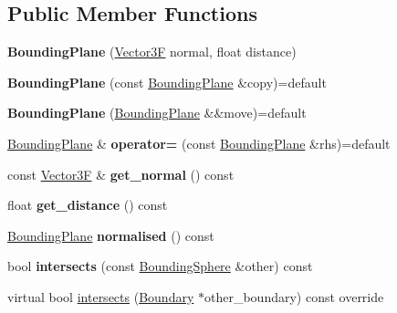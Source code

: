 \subsection*{Public Member Functions}
\begin{DoxyCompactItemize}
\item 
\mbox{\label{class_bounding_plane_a8d0f14beb814c929ed3322b22f662917}} 
{\bfseries Bounding\+Plane} (\mbox{\hyperlink{class_vector3}{Vector3F}} normal, float distance)
\item 
\mbox{\label{class_bounding_plane_a007cc683824c23bc818b2f3584ce5386}} 
{\bfseries Bounding\+Plane} (const \mbox{\hyperlink{class_bounding_plane}{Bounding\+Plane}} \&copy)=default
\item 
\mbox{\label{class_bounding_plane_af1db7dfae2ab49d62f73eb7db3f39e29}} 
{\bfseries Bounding\+Plane} (\mbox{\hyperlink{class_bounding_plane}{Bounding\+Plane}} \&\&move)=default
\item 
\mbox{\label{class_bounding_plane_adbb48a97748ef40bb761a2018f1d2473}} 
\mbox{\hyperlink{class_bounding_plane}{Bounding\+Plane}} \& {\bfseries operator=} (const \mbox{\hyperlink{class_bounding_plane}{Bounding\+Plane}} \&rhs)=default
\item 
\mbox{\label{class_bounding_plane_a7c656534126a09de2768bffe9cdc5964}} 
const \mbox{\hyperlink{class_vector3}{Vector3F}} \& {\bfseries get\+\_\+normal} () const
\item 
\mbox{\label{class_bounding_plane_ac34d406c0f223d599a7b7aad49d4cb54}} 
float {\bfseries get\+\_\+distance} () const
\item 
\mbox{\label{class_bounding_plane_aa271e305ed07117a8c82eedf1fd0f037}} 
\mbox{\hyperlink{class_bounding_plane}{Bounding\+Plane}} {\bfseries normalised} () const
\item 
\mbox{\label{class_bounding_plane_af55931eb0667bcfaa91db85abcddc7a6}} 
bool {\bfseries intersects} (const \mbox{\hyperlink{class_bounding_sphere}{Bounding\+Sphere}} \&other) const
\item 
virtual bool \mbox{\hyperlink{class_bounding_plane_a3d956121121f32384cab3cab34544d6e}{intersects}} (\mbox{\hyperlink{class_boundary}{Boundary}} $\ast$other\+\_\+boundary) const override
\end{DoxyCompactItemize}



